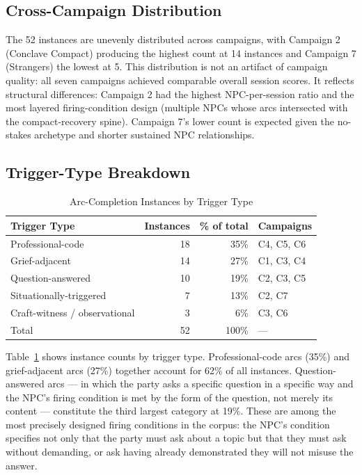 \subsection{Cross-Campaign Distribution}

The 52 instances are unevenly distributed across campaigns, with Campaign 2
(Conclave Compact) producing the highest count at 14 instances and Campaign 7
(Strangers) the lowest at 5. This distribution is not an artifact of campaign
quality: all seven campaigns achieved comparable overall session scores. It
reflects structural differences: Campaign 2 had the highest NPC-per-session
ratio and the most layered firing-condition design (multiple NPCs whose arcs
intersected with the compact-recovery spine). Campaign 7's lower count is
expected given the no-stakes archetype and shorter sustained NPC relationships.

\subsection{Trigger-Type Breakdown}

\begin{table}[t]
\caption{Arc-Completion Instances by Trigger Type}
\label{tab:trigger-types}
\begin{tabular}{@{}lrrl@{}}
\toprule
\textbf{Trigger Type} & \textbf{Instances} & \textbf{\% of total} &
\textbf{Campaigns} \\
\midrule
Professional-code          & 18 & 35\% & C4, C5, C6 \\
Grief-adjacent             & 14 & 27\% & C1, C3, C4 \\
Question-answered          & 10 & 19\% & C2, C3, C5 \\
Situationally-triggered    &  7 & 13\% & C2, C7 \\
Craft-witness / observational &  3 &  6\% & C3, C6 \\
\midrule
Total                      & 52 & 100\% & --- \\
\bottomrule
\end{tabular}
\end{table}

Table~\ref{tab:trigger-types} shows instance counts by trigger type.
Professional-code arcs (35\%) and grief-adjacent arcs (27\%) together account
for 62\% of all instances. Question-answered arcs --- in which the party asks
a specific question in a specific way and the NPC's firing condition is met
by the form of the question, not merely its content --- constitute the third
largest category at 19\%. These are among the most precisely designed firing
conditions in the corpus: the NPC's condition specifies not only that the party
must ask about a topic but that they must ask without demanding, or ask having
already demonstrated they will not misuse the answer.

